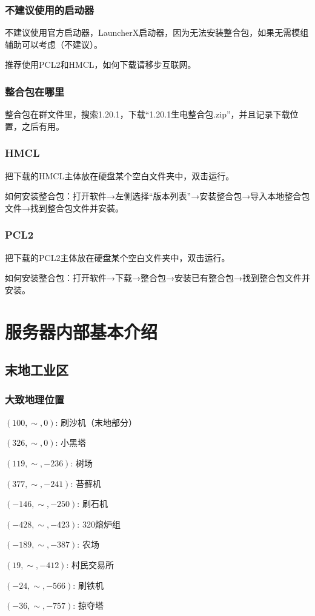 \documentclass[UTF8,a4paper]{article}
\begin{document}
			\subsubsection{不建议使用的启动器}
				\par 不建议使用官方启动器，LauncherX启动器，因为无法安装整合包，如果无需模组辅助可以考虑（不建议）。
				\par 推荐使用PCL2和HMCL，如何下载请移步互联网。
			\subsubsection{整合包在哪里}
				\par 整合包在群文件里，搜索1.20.1，下载“1.20.1生电整合包.zip”，并且记录下载位置，之后有用。
			\subsubsection{HMCL}
				\par 把下载的HMCL主体放在硬盘某个空白文件夹中，双击运行。
				\par 如何安装整合包：打开软件→左侧选择“版本列表”→安装整合包→导入本地整合包文件→找到整合包文件并安装。
			\subsubsection{PCL2}
				\par 把下载的PCL2主体放在硬盘某个空白文件夹中，双击运行。
				\par 如何安装整合包：打开软件→下载→整合包→安装已有整合包→找到整合包文件并安装。
	\section{服务器内部基本介绍}
		\subsection{末地工业区}
			\subsubsection{大致地理位置}
				\par $(100,\sim,0)$: 刷沙机（末地部分）
				\par $(326,\sim,0)$: 小黑塔
				\par $(119,\sim,-236)$: 树场
				\par $(377,\sim,-241)$: 苔藓机
				\par $(-146,\sim,-250)$: 刷石机
				\par $(-428,\sim,-423)$: 320熔炉组
				\par $(-189,\sim,-387)$: 农场
				\par $(19,\sim,-412)$: 村民交易所
				\par $(-24,\sim,-566)$: 刷铁机
				\par $(-36,\sim,-757)$: 掠夺塔
\end{document}
